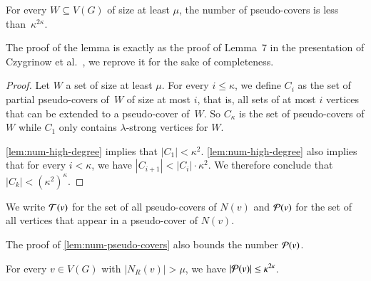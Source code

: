 \begin{lemma}\label{lem:num-pseudo-covers}
  For every $W\subseteq V(G)$ of size at least $\mu$, the number of
  pseudo-covers is less than~$\kappa^{2\kappa}$.
\end{lemma}

The proof of the lemma is exactly as the proof of Lemma~7 in the
presentation of Czygrinow et al.~\cite{czygrinow2018distributed},
we reprove it for the sake of completeness.


\begin{proof}
  Let $W$ a set of size at least $\mu$. For every $i\le \kappa$, we define $C_i$ as the
  set of partial pseudo-covers of~$W$ of size at most $i$, that is,
  all sets of at most $i$ vertices that can be extended to a pseudo-cover
  of~$W$.
  So $C_\kappa$ is the set of pseudo-covers of $W$ while $C_1$ only contains
  $\lambda$-strong vertices for $W$.

  \cref{lem:num-high-degree} implies that $|C_1|< \kappa^2$.
  \cref{lem:num-high-degree} also implies that for every $i<\kappa$, we have
  $|C_{i+1}| < |C_{i}|\cdot \kappa^2$. We therefore conclude that
  $|C_k| < (\kappa^2)^\kappa$.
\end{proof}

\begin{tcolorbox}
  We write $\mathcal{T}(v)$ for the set of all pseudo-covers
  of $N(v)$ and $\mathcal{P}(v)$ for the set of all vertices that appear in a
  pseudo-cover of $N(v)$.
\end{tcolorbox}

The proof of \cref{lem:num-pseudo-covers} also bounds the number $\mathcal{P}(v)$.
\begin{corollary}\label{cor:nb-dominators}
For every $v\in V(G)$ with $|N_R(v)|> \mu$, we have
  $|\mathcal{P}(v)|\le \kappa^{2\kappa}$.
\end{corollary}

%

